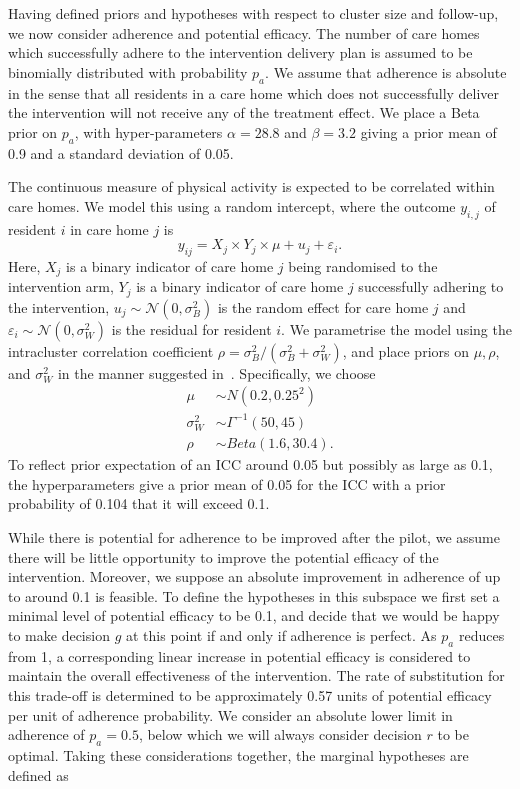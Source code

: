\documentclass[AMA,STIX1COL]{WileyNJD-v2}
\begin{document}
Having defined priors and hypotheses with respect to cluster size and follow-up, we now consider adherence and potential efficacy. The number of care homes which successfully adhere to the intervention delivery plan is assumed to be binomially distributed with probability $p_{a}$. We assume that adherence is absolute in the sense that all residents in a care home which does not successfully deliver the intervention will not receive any of the treatment effect. We place a Beta prior on $p_{a}$, with hyper-parameters $\alpha = 28.8$ and $\beta = 3.2$ giving a prior mean of 0.9 and a standard deviation of 0.05.

The continuous measure of physical activity is expected to be correlated within care homes. We model this using a random intercept, where the outcome $y_{i,j}$ of resident $i$ in care home $j$ is
\begin{equation}
y_{ij} = X_{j} \times Y_{j} \times \mu + u_{j} + \varepsilon_{i}.
\end{equation}
Here, $X_{j}$ is a binary indicator of care home $j$ being randomised to the intervention arm, $Y_{j}$ is a binary indicator of care home $j$ successfully adhering to the intervention, $u_{j} \sim \mathcal{N}(0, \sigma_{B}^{2})$ is the random effect for care home $j$ and $\varepsilon_{i} \sim \mathcal{N}(0, \sigma_{W}^{2})$ is the residual for resident $i$. We parametrise the model using the intracluster correlation coefficient $\rho = \sigma_{B}^{2} / (\sigma_{B}^{2} + \sigma_{W}^{2})$, and place priors on $\mu, \rho$, and $\sigma_{W}^{2}$ in the manner suggested in~\cite{Spiegelhalter2001}. Specifically, we choose
\begin{align}
\mu & \sim N(0.2, 0.25^{2}) \\
\sigma_{W}^{2} & \sim \Gamma^{-1}(50, 45) \\
\rho & \sim Beta(1.6, 30.4).
\end{align}
To reflect prior expectation of an ICC around 0.05 but possibly as large as 0.1, the hyperparameters give a prior mean of 0.05 for the ICC with a prior probability of 0.104 that it will exceed 0.1. 

While there is potential for adherence to be improved after the pilot, we assume there will be little opportunity to improve the potential efficacy of the intervention. Moreover, we suppose an absolute improvement in adherence of up to around 0.1 is feasible. To define the hypotheses in this subspace we first set a minimal level of potential efficacy to be 0.1, and decide that we would be happy to make decision $g$ at this point if and only if adherence is perfect. As $p_{a}$ reduces from 1, a corresponding linear increase in potential efficacy is considered to maintain the overall effectiveness of the intervention. The rate of substitution for this trade-off is determined to be approximately 0.57 units of potential efficacy per unit of adherence probability. We consider an absolute lower limit in adherence of $p_{a} = 0.5$, below which we will always consider decision $r$ to be optimal. Taking these considerations together, the marginal hypotheses are defined as
\end{document}
